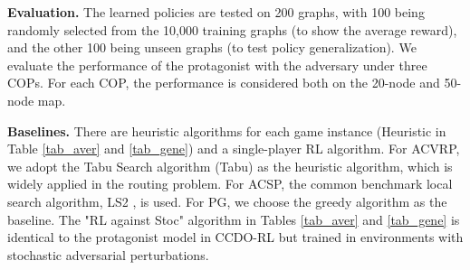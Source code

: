 
\textbf{Evaluation.} The learned policies are tested on 200 graphs, with 100 being randomly selected from the 10,000 training graphs (to show the average reward), and the other 100 being unseen graphs (to test policy generalization). We evaluate the performance of the protagonist with the adversary under three COPs. For each COP, the performance is considered both on the 20-node and 50-node map.

\textbf{Baselines.} There are heuristic algorithms for each game instance (Heuristic in Table \ref{tab_aver} and \ref{tab_gene}) and a single-player RL algorithm. For ACVRP, we adopt the Tabu Search algorithm (Tabu) \citep{li2020improved} as the heuristic algorithm, which is widely applied in the routing problem. For ACSP, the common benchmark local search algorithm, LS2 \citep{golden2012generalized}, is used. For PG, we choose the greedy algorithm as the baseline. The "RL against Stoc" algorithm in Tables \ref{tab_aver} and \ref{tab_gene} is identical to the protagonist model in CCDO-RL but trained in environments with stochastic adversarial perturbations.


